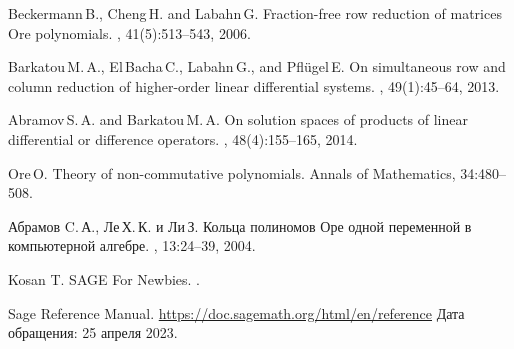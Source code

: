 \renewcommand*\refname{Литература}

\begin{thebibliography}{1}
    Beckermann\,B., Cheng\,H. and Labahn\,G.
    \newblock Fraction-free row reduction of matrices Ore polynomials.
    , 41(5):513--543, 2006.

    Barkatou\,M.\,A., El\,Bacha\,C., Labahn\,G., and Pfl\"ugel\,E.
    \newblock On simultaneous row and column reduction of higher-order linear
      differential systems.
    , 49(1):45--64, 2013.
    
    Abramov\,S.\,A. and Barkatou\,M.\,A.
    \newblock On solution spaces of products of linear differential or difference
      operators.
    , 48(4):155--165, 2014.

    Ore\,O.
    \newblock Theory of non-commutative polynomials.
    \newblock Annals of Mathematics, 34:480--508.
    
    Абрамов C.\,А., Ле\,Х.\,К. и Ли\,З.
    \newblock Кольца полиномов Оре одной
      переменной в компьютерной алгебре.
    , 13:24--39, 2004.
    
    Kosan T.
    \newblock SAGE For Newbies.
    .
    
    Sage Reference Manual.
    \newblock
      \url{https://doc.sagemath.org/html/en/reference}
    \newblock Дата обращения: 25 апреля 2023.
    \end{thebibliography}